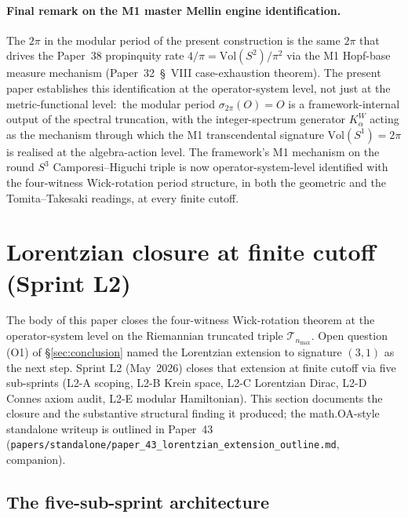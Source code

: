\documentclass[11pt,a4paper]{article}
\theoremstyle{plain}
\theoremstyle{definition}
\newcommand{\nmax}{n_{\max}}
\newcommand{\sthree}{S^{3}}
\newcommand{\Tcal}{\mathcal{T}}
\newcommand{\Vol}{\mathrm{Vol}}
\begin{document}
\paragraph{Final remark on the M1 master Mellin engine identification.}
The $2\pi$ in the modular period of the present construction is the
same $2\pi$ that drives the Paper~38 propinquity rate
$4/\pi = \Vol(S^2)/\pi^2$ via the M1 Hopf-base measure mechanism
(Paper~32~\S~VIII case-exhaustion theorem). The present paper
establishes this identification at the operator-system level, not
just at the metric-functional level:\ the modular period
$\sigma_{2\pi}(O) = O$ is a framework-internal output of the spectral
truncation, with the integer-spectrum generator $K_\alpha^W$ acting
as the mechanism through which the M1 transcendental signature
$\Vol(S^1) = 2\pi$ is realised at the algebra-action level. The
framework's M1 mechanism on the round $\sthree$ Camporesi--Higuchi
triple is now operator-system-level identified with the four-witness
Wick-rotation period structure, in both the geometric and the
Tomita--Takesaki readings, at every finite cutoff.

\section{Lorentzian closure at finite cutoff (Sprint L2)}
\label{sec:lorentzian_closure}

The body of this paper closes the four-witness Wick-rotation theorem
at the operator-system level on the Riemannian truncated triple
$\Tcal_{\nmax}$.  Open question (O1) of \S\ref{sec:conclusion} named
the Lorentzian extension to signature $(3, 1)$ as the next step.
Sprint L2 (May~2026) closes that extension at finite cutoff via
five sub-sprints (L2-A scoping, L2-B Krein space, L2-C Lorentzian
Dirac, L2-D Connes axiom audit, L2-E modular Hamiltonian).  This
section documents the closure and the substantive structural finding
it produced; the math.OA-style standalone writeup is outlined in
Paper~43 (\texttt{papers/standalone/paper\_43\_lorentzian\_extension\_outline.md},
companion).

\subsection{The five-sub-sprint architecture}
\label{sec:lorentzian_closure_architecture}
\end{document}

